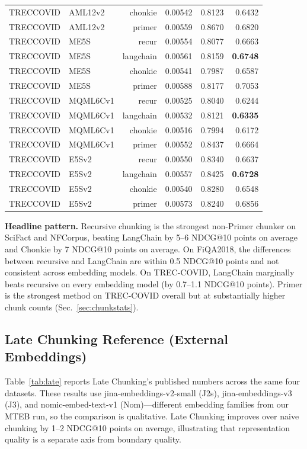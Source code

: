 \documentclass[conference]{IEEEtran}
\begin{document}
\begin{table}[!t]
\begin{tabular}{llrrrr}
TRECCOVID & AML12v2 & chonkie   & 0.00542 & 0.8123 & 0.6432 \\
TRECCOVID & AML12v2 & primer    & 0.00559 & 0.8670 & 0.6820 \\
TRECCOVID & ME5S    & recur     & 0.00554 & 0.8077 & 0.6663 \\
TRECCOVID & ME5S    & langchain & 0.00561 & 0.8159 & \textbf{0.6748} \\
TRECCOVID & ME5S    & chonkie   & 0.00541 & 0.7987 & 0.6587 \\
TRECCOVID & ME5S    & primer    & 0.00588 & 0.8177 & 0.7053 \\
TRECCOVID & MQML6Cv1 & recur    & 0.00525 & 0.8040 & 0.6244 \\
TRECCOVID & MQML6Cv1 & langchain & 0.00532 & 0.8121 & \textbf{0.6335} \\
TRECCOVID & MQML6Cv1 & chonkie  & 0.00516 & 0.7994 & 0.6172 \\
TRECCOVID & MQML6Cv1 & primer   & 0.00552 & 0.8437 & 0.6664 \\
TRECCOVID & E5Sv2   & recur     & 0.00550 & 0.8340 & 0.6637 \\
TRECCOVID & E5Sv2   & langchain & 0.00557 & 0.8425 & \textbf{0.6728} \\
TRECCOVID & E5Sv2   & chonkie   & 0.00540 & 0.8280 & 0.6548 \\
TRECCOVID & E5Sv2   & primer    & 0.00573 & 0.8240 & 0.6856 \\
\bottomrule
\end{tabular}
\end{table}

\noindent\textbf{Headline pattern.} Recursive chunking is the strongest
non-Primer chunker on SciFact and NFCorpus, beating LangChain by 5--6
NDCG@10 points on average and Chonkie by 7 NDCG@10 points on average. On
FiQA2018, the differences between recursive and LangChain are within
0.5 NDCG@10 points and not consistent across embedding models. On
TREC-COVID, LangChain marginally beats recursive on every embedding model
(by 0.7--1.1 NDCG@10 points). Primer is the strongest method on TREC-COVID
overall but at substantially higher chunk counts (Sec.~\ref{sec:chunkstats}).

\subsection{Late Chunking Reference (External Embeddings)}

Table~\ref{tab:late} reports Late Chunking's published numbers across the
same four datasets. These results use jina-embeddings-v2-small (J2s),
jina-embeddings-v3 (J3), and nomic-embed-text-v1 (Nom)---different
embedding families from our MTEB run, so the comparison is qualitative.
Late Chunking improves over naive chunking by 1--2 NDCG@10 points on
average, illustrating that representation quality is a separate axis from
boundary quality.
\end{document}

